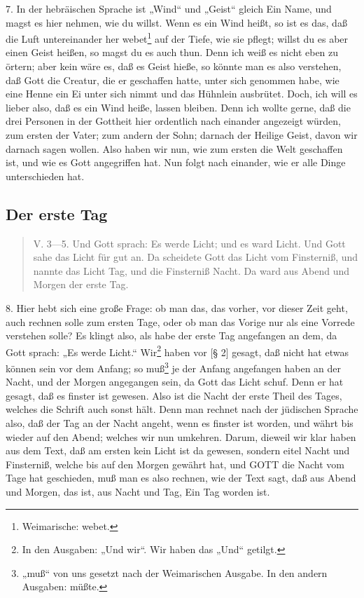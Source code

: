 7. In der hebräischen Sprache ist „Wind“ und „Geist“ gleich Ein Name, und magst es hier nehmen, wie du willst. Wenn es ein Wind heißt, so ist es das, daß die Luft untereinander her webet\footnote{Weimarische: webet.} auf der Tiefe, wie sie pflegt; willst du es aber einen Geist heißen, so magst du es auch thun. Denn ich weiß es nicht eben zu örtern; aber kein wäre es, daß es Geist hieße, so könnte man es also verstehen, daß Gott die Creatur, die er geschaffen hatte, unter sich genommen habe, wie eine Henne ein Ei unter sich nimmt und das Hühnlein ausbrütet. Doch, ich will es lieber also, daß es ein Wind heiße, lassen bleiben. Denn ich wollte gerne, daß die drei Personen in der Gottheit hier ordentlich nach einander angezeigt würden, zum ersten der Vater; zum andern der Sohn; darnach der Heilige Geist, davon wir darnach sagen wollen. Also haben wir nun, wie zum ersten die Welt geschaffen ist, und wie es Gott angegriffen hat. Nun folgt nach einander, wie er alle Dinge unterschieden hat.

\subsection{Der erste Tag}

\begin{quote}
V. 3—5. Und Gott sprach: Es werde Licht; und es ward Licht. Und Gott sahe das Licht für gut an. Da scheidete Gott das Licht vom Finsterniß, und nannte das Licht Tag, und die Finsterniß Nacht. Da ward aus Abend und Morgen der erste Tag.
\end{quote}

8. Hier hebt sich eine große Frage: ob man das, das vorher, vor dieser Zeit geht, auch rechnen solle zum ersten Tage, oder ob man das Vorige nur als eine Vorrede verstehen solle? Es klingt also, als habe der erste Tag angefangen an dem, da Gott sprach: „Es werde Licht.“ Wir\footnote{In den Ausgaben: „Und wir“. Wir haben das „Und“ getilgt.} haben vor [§ 2] gesagt, daß nicht hat etwas können sein vor dem Anfang; so muß\footnote{„muß“ von uns gesetzt nach der Weimarischen Ausgabe. In den andern Ausgaben: müßte.} je der Anfang angefangen haben an der Nacht, und der Morgen angegangen sein, da Gott das Licht schuf. Denn er hat gesagt, daß es finster ist gewesen. Also ist die Nacht der erste Theil des Tages, welches die Schrift auch sonst hält. Denn man rechnet nach der jüdischen Sprache also, daß der Tag an der Nacht angeht, wenn es finster ist worden, und währt bis wieder auf den Abend; welches wir nun umkehren. Darum, dieweil wir klar haben aus dem Text, daß am ersten kein Licht ist da gewesen, sondern
eitel Nacht und Finsterniß, welche bis auf den Morgen gewährt hat, und GOTT die Nacht vom Tage hat geschieden, muß man es also rechnen, wie der Text sagt, daß aus Abend und Morgen, das ist, aus Nacht und Tag, Ein Tag worden ist.


